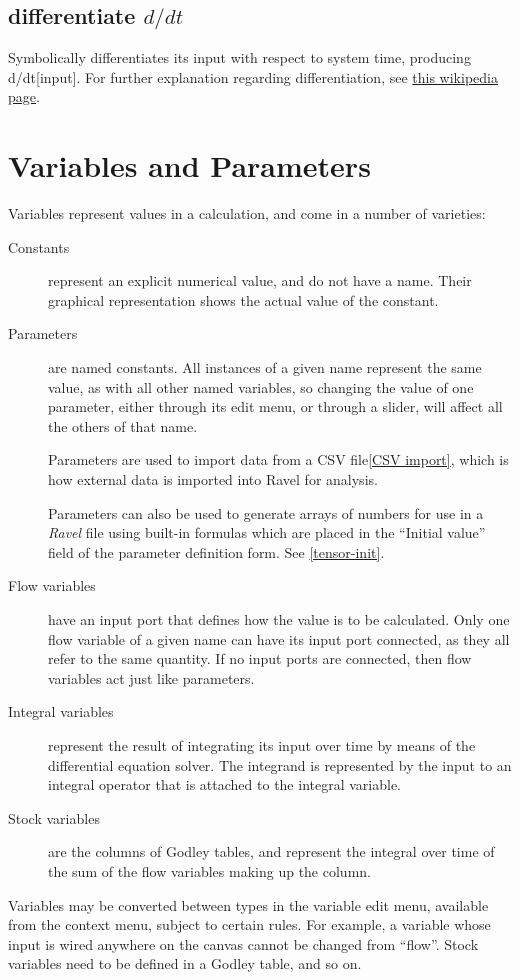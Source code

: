 \subsection{differentiate $d/dt$}


\label{Operation:differentiate} Symbolically differentiates its input
with respect to system time, producing d/dt{[}input{]}. For further
explanation regarding differentiation, see \href{https://en.wikipedia.org/wiki/Derivative}{this wikipedia page}.


\section{Variables and Parameters}

\label{Variables}\label{Variable:constant}\label{VarConstant}\label{Variable:parameter}
\label{Variable:flow}\label{Variable:integral}\label{Variable:stock}


Variables represent values in a calculation, and come in a number
of varieties: 
\begin{description}
\item [{Constants}] represent an explicit numerical value, and do not have
a name. Their graphical representation shows the actual value of the
constant. 
\item [{Parameters}] are named constants. All instances of a given name
represent the same value, as with all other named variables, so changing
the value of one parameter, either through its edit menu, or through
a slider, will affect all the others of that name.

Parameters are used to import data from a CSV file\ref{CSV import},
which is how external data is imported into Ravel for analysis.

Parameters can also be used to generate arrays of numbers for
use in a \emph{Ravel} file using built-in formulas which are placed
in the ``Initial value'' field of the parameter definition form.
See \ref{tensor-init}.
\item [{Flow variables}] have an input port that defines how the value
is to be calculated. Only one flow variable of a given name can have
its input port connected, as they all refer to the same quantity.
If no input ports are connected, then flow variables act just like
parameters. 
\item [{Integral variables}] represent the result of integrating its input
over time by means of the differential equation solver. The integrand
is represented by the input to an integral operator that is attached
to the integral variable. 
\item [{Stock variables}] are the columns of Godley tables, and represent
the integral over time of the sum of the flow variables making up
the column. 
\end{description}
Variables may be converted between types in the variable edit menu,
available from the context menu, subject to certain rules. For example,
a variable whose input is wired anywhere on the canvas cannot be changed
from ``flow''. Stock variables need to be defined in a Godley table,
and so on.

